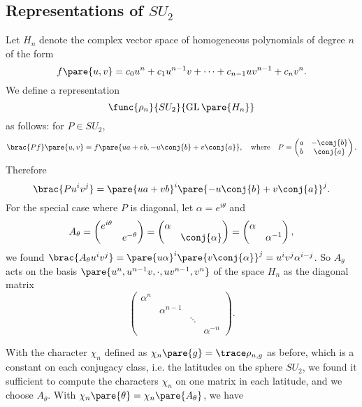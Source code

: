 \documentclass[hidelinks]{article}
\DeclareMathOperator{\GL}{GL}
\begin{document}

\subsection{Representations of \texorpdfstring{$SU_2$}{SU2}} %
\label{sub:representations_of_su2}

Let $H_n$ denote the complex vector space of homogeneous polynomials of degree $n$ of the form
\[ f\pare{u,v} = c_0 u^n + c_1 u^{n-1}v + \cdots + c_{n-1} uv^{n-1} + c_nv^n. \]
We define a representation
\[ \func{\rho_n}{SU_2}{\GL\pare{H_n}} \]
as follows: for $P \in SU_2$,
\[ \brac{Pf}\pare{u,v} = f\pare{ua+vb,-u\conj{b} + v\conj{a}},\quad \mathrm{where}\quad P = \begin{pmatrix}
    a & -\conj{b} \\
    b & \conj{a}
\end{pmatrix}. \]
Therefore
\[ \brac{Pu^iv^j} = \pare{ua+vb}^i\pare{-u\conj{b}+v\conj{a}}^j. \]
For the special case where $P$ is diagonal, let $\alpha = e^{i\theta}$ and
\[ A_\theta = \begin{pmatrix}
    e^{i\theta} & \\
    & e^{-\theta}
\end{pmatrix} = \begin{pmatrix}
    \alpha & \\
    & \conj{\alpha}
\end{pmatrix} = \begin{pmatrix}
    \alpha & \\
    & \alpha^{-1}
\end{pmatrix}, \]
we found $\brac{A_\theta u^i v^j} = \pare{u\alpha}^i \pare{v\conj{\alpha}}^j = u^i v^j \alpha^{i-j}$. So $A_\theta$ acts on the basis $\pare{u^n, u^{n-1}v,\cdot, uv^{n-1},v^n}$ of the space $H_n$ as the diagonal matrix
\[ \begin{pmatrix}
    \alpha^n & & & \\
    & \alpha^{n-1} \\
    & & \ddots \\
    & & & \alpha^{-n}
\end{pmatrix}. \]
\par
With the character $\chi_n$ defined as $\chi_n\pare{g} = \trace \rho_{n,g}$ as before, which is a constant on each conjugacy class, i.e. the latitudes on the sphere $SU_2$, we found it sufficient to compute the characters $\chi_n$ on one matrix in each latitude, and we choose $A_\theta$. With $\chi_n\pare{\theta} = \chi_n\pare{A_\theta}$, we have
\end{document}
